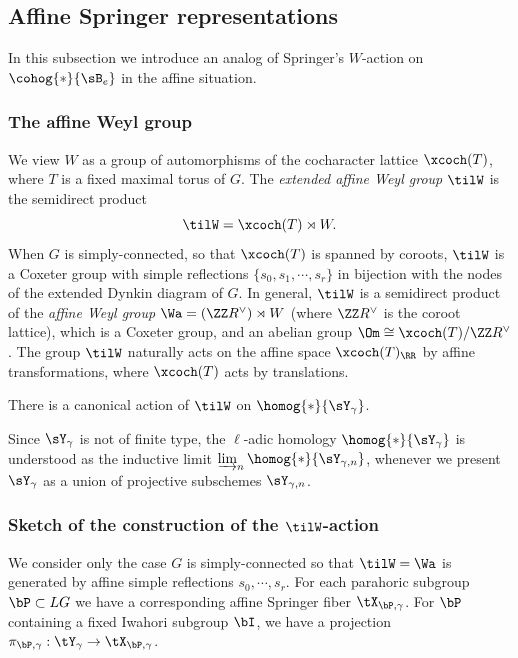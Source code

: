 \subsection{Affine Springer representations}
In this subsection we introduce an analog of Springer's $W$-action on $\cohog{*}{\sB_{e}}$ in the affine situation.  

\subsubsection{The affine Weyl group} We view $W$ as a group of automorphisms of the cocharacter lattice $\xcoch(T)$, where $T$ is a fixed maximal torus of $G$. The {\em extended affine Weyl group} $\tilW$ is the semidirect product
\begin{equation*}
\tilW=\xcoch(T)\rtimes W.
\end{equation*}
When $G$ is simply-connected, so that $\xcoch(T)$ is spanned by coroots, $\tilW$ is a Coxeter group with simple reflections $\{s_{0},s_{1}, \cdots,s_{r}\}$ in bijection with the nodes of the extended Dynkin diagram of $G$.  In general, $\tilW$ is a semidirect product of the {\em affine Weyl group} $\Wa=(\ZZ R^{\vee})\rtimes W$ (where $\ZZ R^{\vee}$ is the coroot lattice), which is a Coxeter group, and an abelian group $\Om\cong \xcoch(T)/\ZZ R^{\vee}$. The group $\tilW$ naturally acts on the affine space $\xcoch(T)_{\RR}$ by affine transformations, where $\xcoch(T)$ acts by translations.

\begin{theorem}\label{th:aff action} There is a canonical action of $\tilW$  on $\homog{*}{\sY_{\gamma}}$. 
\end{theorem}

Since $\sY_{\gamma}$ is not of finite type, the $\ell$-adic homology $\homog{*}{\sY_{\gamma}}$ is understood as the inductive limit $\varinjlim_{n}\homog{*}{\sY_{\gamma,n}}$, whenever we present $\sY_{\gamma}$ as a union of projective subschemes $\sY_{\gamma,n}$.

\subsubsection{Sketch of the construction of the $\tilW$-action} We consider only the case $G$ is simply-connected so that $\tilW=\Wa$ is generated by affine simple reflections $s_{0}, \cdots, s_{r}$. For each parahoric  subgroup $\bP\subset LG$ we have a corresponding affine Springer fiber $\tX_{\bP,\gamma}$. For $\bP$ containing a fixed Iwahori subgroup $\bI$, we have a projection $\pi_{\bP,\gamma}:\tY_{\gamma}\to \tX_{\bP,\gamma}$. 

